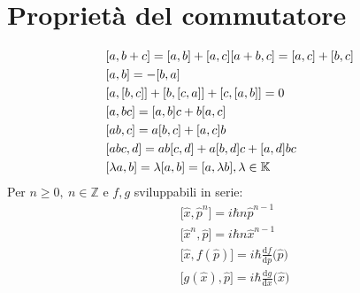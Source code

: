 \documentclass[11pt, a4paper]{scrartcl} %
\numberwithin{equation}{section}
\theoremstyle{style2}
\theoremstyle{style1}
\begin{document}
\section{Propriet\`a del commutatore}
\begin{multicols}{2}
	\begin{equation*}
		\begin{split}
			& [a,b + c] = [a,b] + [a,c]\vspace{1cm} [a + b,c] = [a,c] + [b,c]\\
			& [a,b] = - [b,a]\\
 			&[a,[b,c]] + [b,[c,a]] + [c,[a,b]] = 0\\
			&[a,bc] = [a,b]c + b[a,c]\\
			& [ab,c] = a[b,c] + [a,c]b\\
			& [abc,d]  = ab[c,d] + a[b,d]c + [a,d]bc\\
			& [\lambda a,b] = \lambda[a,b] = [a,\lambda b], \lambda \in \mathbb{K}
		\end{split}
	\end{equation*}
Per $n\ge 0, \ n \in \mathbb{Z}$ e $f,g$ sviluppabili in serie: 
\begin{equation*}
	\begin{split}
		&\bigl[\hat x,\hat p^n \bigr] = i\hbar n\hat p^{n-1}\\
		&\bigl[\hat x^n,\hat p \bigr] = i\hbar n\hat x^{n-1} \\
		&\bigl[\hat x,f(\hat p)\bigr] = i\hbar \frac{\mathrm{d}f}{\mathrm{d}p} \bigl(\hat p\bigr)\\
		&\bigl[g(\hat x),\hat p\bigr] = i\hbar \frac{\mathrm{d}g}{\mathrm{d}x} \bigl(\hat x\bigr)
	\end{split}
\end{equation*}
\end{multicols}
\end{document}
